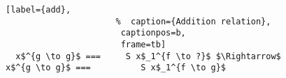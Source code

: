 \begin{figure}[!t]
  \centering
  \begin{minipage}{\columnwidth}
    \begin{lstlisting}[label={add},
                      %  caption={Addition relation},
                       captionpos=b,
                       frame=tb]
  x$^{g \to g}$ ===     S x$_1^{f \to ?}$ $\Rightarrow$ x$^{g \to g}$ ===          S x$_1^{f \to g}$
    \end{lstlisting}
  \end{minipage}
\end{figure}